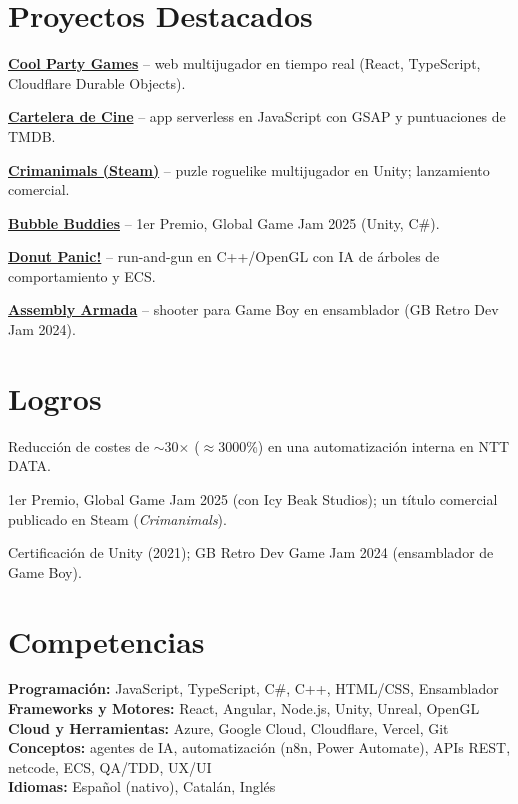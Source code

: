 \documentclass[10pt,a4paper]{article}
\begin{document}
\section{Proyectos Destacados}
\begin{cvitems}
  \item \textbf{\href{https://cool-party-games.vercel.app}{Cool Party Games}} -- web multijugador en tiempo real (React, TypeScript, Cloudflare Durable Objects).
  \item \textbf{\href{https://films-reviewer.vercel.app}{Cartelera de Cine}} -- app serverless en JavaScript con GSAP y puntuaciones de TMDB.
  \item \textbf{\href{https://store.steampowered.com/app/4004930/Crimanimals/}{Crimanimals (Steam)}} -- puzle roguelike multijugador en Unity; lanzamiento comercial.
  \item \textbf{\href{https://jsala.itch.io/bubblebuddies}{Bubble Buddies}} -- 1er Premio, Global Game Jam 2025 (Unity, C\#).
  \item \textbf{\href{https://eps.ua.es/es/ingenieria-multimedia/videojuegos/webs-grupos/curso-2024-25/grupo-icy-beak-studios-videojuego-donut-panic.html}{Donut Panic!}} -- run-and-gun en C++/OpenGL con IA de \'arboles de comportamiento y ECS.
  \item \textbf{\href{https://itch.io/jam/gbretrodev24/rate/3055980}{Assembly Armada}} -- shooter para Game Boy en ensamblador (GB Retro Dev Jam 2024).
\end{cvitems}

\section{Logros}
\begin{cvitems}
  \item Reducci\'on de costes de $\sim$30$\times$ ($\approx$3000\%) en una automatizaci\'on interna en NTT DATA.
  \item 1er Premio, Global Game Jam 2025 (con Icy Beak Studios); un t\'itulo comercial publicado en Steam (\textit{Crimanimals}).
  \item Certificaci\'on de Unity (2021); GB Retro Dev Game Jam 2024 (ensamblador de Game Boy).
\end{cvitems}

\section{Competencias}
\textbf{Programaci\'on:} JavaScript, TypeScript, C\#, C++, HTML/CSS, Ensamblador \\[2.5pt]
\textbf{Frameworks y Motores:} React, Angular, Node.js, Unity, Unreal, OpenGL \\[2.5pt]
\textbf{Cloud y Herramientas:} Azure, Google Cloud, Cloudflare, Vercel, Git \\[2.5pt]
\textbf{Conceptos:} agentes de IA, automatizaci\'on (n8n, Power Automate), APIs REST, netcode, ECS, QA/TDD, UX/UI \\[2.5pt]
\textbf{Idiomas:} Espa\~nol (nativo), Catal\'an, Ingl\'es
\end{document}
